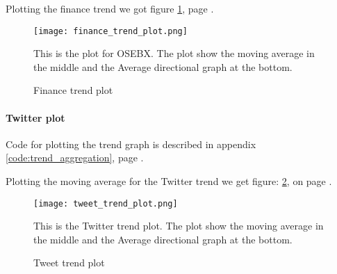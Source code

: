 Plotting the finance trend we got figure \ref{fig:trend_finance_plot}, page
\pageref{fig:trend_finance_plot}.
\begin{figure}[htb]
    \centering
    \texttt{[image: finance\_trend\_plot.png]}
    \label{fig:trend_finance_plot}
    \caption{Finance trend plot}
This is the plot for OSEBX. The plot show the moving average in the middle and
the Average directional graph at the bottom.
\end{figure}


\paragraph{Twitter plot}
Code for plotting the trend graph is described in appendix
\ref{code:trend_aggregation}, page \pageref{code:trend_aggregation}.

Plotting the moving average for the Twitter trend we get figure:
\ref{fig:trend_tweet_plot}, on page
\pageref{fig:trend_tweet_plot}.

\begin{figure}[htb]
    \texttt{[image: tweet\_trend\_plot.png]}
    \label{fig:trend_tweet_plot}
    \caption{Tweet trend plot}
This is the Twitter trend plot. The plot show the moving average in the middle
and the Average directional graph at the bottom.
\end{figure}
%

